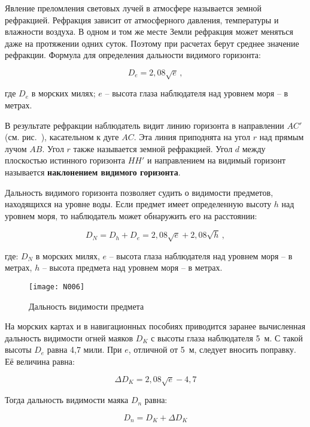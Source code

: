 Явление преломления световых лучей в атмосфере называется земной рефракцией. Рефракция зависит от атмосферного давления, температуры и влажности воздуха. В одном и том же месте Земли рефракция может меняться даже на протяжении одних суток. Поэтому при расчетах берут среднее значение рефракции. Формула для определения дальности видимого горизонта:

\begin{equation}
  D_e = 2,08 \sqrt{e} \, ,
\end{equation}

где $D_e$ в морских милях; $e$ \--- высота глаза наблюдателя над уровнем моря \--- в метрах.

В результате рефракции наблюдатель видит линию горизонта в направлении $AC'$ (см. рис.~), касательном к дуге $AC$. Эта линия приподнята на угол $r$ над прямым лучом $AB$. Угол $r$ также называется земной рефракцией. Угол $d$ между плоскостью истинного горизонта $HH'$ и направлением на видимый горизонт называется \textbf{наклонением видимого горизонта}.  

Дальность видимого горизонта позволяет судить о видимости предметов, находящихся на уровне воды. Если предмет имеет определенную высоту $h$ над уровнем моря, то наблюдатель может обнаружить его на расстоянии: 

\begin{equation}
  D_N = D_h + D_e = 2,08 \sqrt{e} + 2,08 \sqrt{h} \, , 
\end{equation}

где: $D_N$ в морских милях, $e$ \--- высота глаза наблюдателя над уровнем моря \--- в метрах, $h$ \--- высота предмета над уровнем моря \--- в метрах. 

\begin{figure*}[htb]
  \centering{}
  \texttt{[image: N006]}
  \caption{Дальность видимости предмета}
  \label{fig:N6}
\end{figure*}

На морских картах и в навигационных пособиях приводится заранее вычисленная дальность видимости огней маяков $D_K$ с высоты глаза наблюдателя 5~м. С такой высоты $D_e$ равна 4,7 мили. При $e$, отличной от 5~м, следует вносить поправку. Её величина равна:

\begin{equation}
  \Delta D_K = 2,08 \sqrt{e} - 4,7 
\end{equation}

Тогда дальность видимости маяка $D_n$ равна: 

\begin{equation}
  D_n = D_K +  \Delta D_K 
\end{equation}

